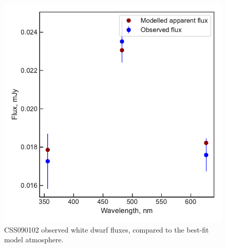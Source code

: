 \begin{figure}
    \centering
    \includegraphics[width=\textwidth]{figures/results/CSS090102/fluxplot.pdf}
    \caption{CSS090102 observed white dwarf fluxes, compared to the best-fit model atmosphere.}
    \label{fig:CSS090102 flux plot}
\end{figure}
\clearpage


